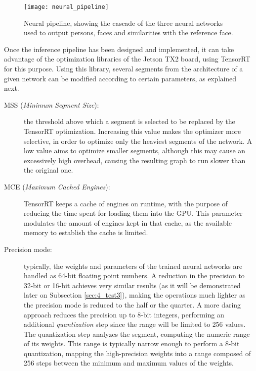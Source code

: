 \begin{figure}[h]
	\centering
	\texttt{[image: neural\_pipeline]}
	\caption{Neural pipeline, showing the cascade of the three neural networks used to output persons, faces and similarities with the reference face.}
	\label{fig:3_neural_pipeline}
\end{figure}

\vspace{1.7cm}

Once the inference pipeline has been designed and implemented, it can take advantage of the optimization libraries of the Jetson TX2 board, using TensorRT for this purpose. Using this library, several segments from the architecture of a given network can be modified according to certain parameters, as explained next.

\begin{description}
	\item[MSS (\textit{Minimum Segment Size}):] the threshold above which a segment is selected to be replaced by the TensorRT optimization. Increasing this value makes the optimizer more selective, in order to optimize only the heaviest segments of the network. A low value aims to optimize smaller segments, although this may cause an excessively high overhead, causing the resulting graph to run slower than the original one. 
	\item[MCE (\textit{Maximum Cached Engines}):] TensorRT keeps a cache of engines on runtime, with the purpose of reducing the time spent for loading them into the GPU. This parameter modulates the amount of engines kept in that cache, as the available memory to establish the cache is limited.
	\item[Precision mode:] typically, the weights and parameters of the trained neural networks are handled as 64-bit floating point numbers. A reduction in the precision to 32-bit or 16-bit achieves very similar results (as it will be demonstrated later on Subsection \ref{sec:4_test3}), making the operations much lighter as the precision mode is reduced to the half or the quarter. A more daring approach reduces the precision up to 8-bit integers, performing an additional \textit{quantization} step since the range will be limited to 256 values. The quantization step analyzes the segment, computing the numeric range of its weights. This range is typically narrow enough to perform a 8-bit quantization, mapping the high-precision weights into a range composed of 256 steps between the minimum and maximum values of the weights.
\end{description}

